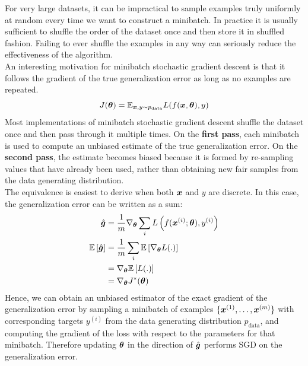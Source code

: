 \begin{multicols}{2}
	For very large datasets, it can be impractical to sample examples truly uniformly at random every time we want to construct a minibatch.
	In practice it is usually sufficient to shuffle the order of the dataset once and then store it in shuffled fashion.
	Failing to ever shuffle the examples in any way can seriously reduce the effectiveness of the algorithm.\\

	An interesting motivation for minibatch stochastic gradient descent is that it follows the gradient of the true generalization error as long as no examples are repeated.
	\[ J(\bol{\theta}) = \Exp_{\bol{x},y\sim p_{\text{data}}} L(f(\vx,\bol{\theta}),y) \]
	Most implementations of minibatch stochastic gradient descent shuffle the dataset once and then pass through it multiple times.
	On the \textbf{first pass}, each minibatch is used to compute an unbiased estimate of the true generalization error.
	On the \textbf{second pass}, the estimate becomes biased because it is formed by re-sampling values that have already been used, rather than obtaining new fair samples from the data generating distribution.\\

	The equivalence is easiest to derive when both ${\bm{x}}$ and $y$ are discrete. In this case, the generalization error can be written as a sum:
	\begin{align*}
	\hat{\bol{g}} &= \frac{1}{m}\nabla_\bolt \sum_i L\left(f(\vx^{(i)};\bolt),y^{(i)}\right)\\
	\Exp\left[\hat{\bol{g}}\right] &= \frac{1}{m} \sum_i \Exp\left[\nabla_\bolt L(.)\right]\\
	&= \nabla_\bolt \Exp\left[L(.)\right]\\
	&= \nabla_\bolt J^\ast (\bolt)
	\end{align*}
	Hence, we can obtain an unbiased estimator of the exact gradient of the generalization error by sampling a minibatch of examples $\{{\bm{x}}^{(1)},\dots,{\bm{x}}^{(m)}\}$ with corresponding targets $y^{(i)}$ from the data generating distribution $ p_{\text{data}} $, and computing the gradient of the loss with respect to the parameters for that minibatch. Therefore updating $\bolt$ in the direction of $\hat{\bol{g}}$ performs SGD on the generalization error.
	\newpage

\end{multicols}
